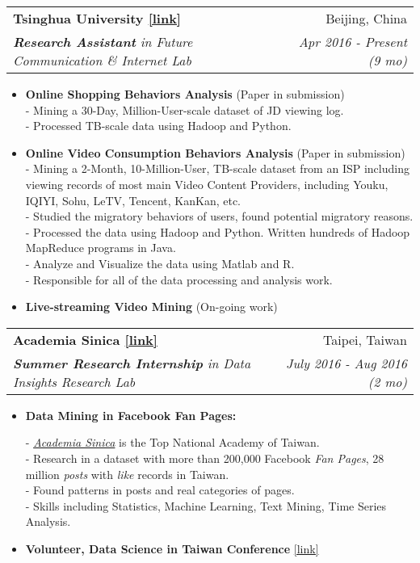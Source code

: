 \documentclass[letterpaper,11pt]{article}
\makeatletter
\newcommand{\resumeItem}[2]{
  \item\small{
    \textbf{#1}{ #2 \vspace{-2pt}}
  }
}
\newcommand{\resumeSubheading}[4]{
  \vspace{-1pt}\item
    \begin{tabular*}{0.97\textwidth}{l@{\extracolsep{\fill}}r}
      \textbf{#1} & #2 \\
      \textit{\small#3} & \textit{\small #4} \\
    \end{tabular*}\vspace{-5pt}
}
\newcommand{\resumeItemListStart}{\begin{itemize}}
\newcommand{\resumeItemListEnd}{\end{itemize}\vspace{-5pt}}
\makeatother
\begin{document}
    \resumeSubheading
      {Tsinghua University \color{blue}\href{http://fi.ee.tsinghua.edu.cn}{[link]}}{Beijing, China}
      {\textbf{Research Assistant} in Future Communication \& Internet Lab}{Apr 2016 - Present (9 mo)}
      \resumeItemListStart
        \resumeItem{Online Shopping Behaviors Analysis}{(Paper in submission)}\\
          {- Mining a 30-Day, Million-User-scale dataset of JD viewing log.}\\
          {- Processed TB-scale data using Hadoop and Python.}\\
        \resumeItem{Online Video Consumption Behaviors Analysis}{(Paper in submission)}\\
          {- Mining a 2-Month, 10-Million-User, TB-scale dataset from an ISP including viewing records of most main Video Content Providers, including Youku, IQIYI, Sohu, LeTV, Tencent, KanKan, etc.}\\
          {- Studied the migratory behaviors of users, found potential migratory reasons.}\\
          {- Processed the data using Hadoop and Python. Written hundreds of Hadoop MapReduce programs in Java.}\\
          {- Analyze and Visualize the data using Matlab and R.}\\
          {- Responsible for all of the data processing and analysis work.}
        \resumeItem{Live-streaming Video Mining}{(On-going work)}\\
          {}
      \resumeItemListEnd
  
    \resumeSubheading
      {Academia Sinica \color{blue}\href{http://mmnet.iis.sinica.edu.tw}{[link]}}{Taipei, Taiwan}
      {\textbf{Summer Research Internship} in Data Insights Research Lab}{July 2016 - Aug 2016 (2 mo)}
      \resumeItemListStart
        \resumeItem{Data Mining in Facebook Fan Pages: }\\
          {- \href{https://www.sinica.edu.tw/ch}{\emph{Academia Sinica}} is the Top National Academy of Taiwan.}\\
          {- Research in a dataset with more than 200,000 Facebook \emph{Fan Pages}, 28 million \emph{posts} with \emph{like} records in Taiwan.}\\
          {- Found patterns in posts and real categories of pages.}\\
          {- Skills including Statistics, Machine Learning, Text Mining, Time Series Analysis.}
        \resumeItem{Volunteer, Data Science in Taiwan Conference} {\color{blue}\href{http://www.datasci.tw}{[link]}} \\
      \resumeItemListEnd
\end{document}
